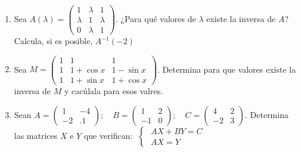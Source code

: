 \begin{enumerate}
\item Sea $A(\lambda)=\left( \begin{matrix} 1&\lambda&1\\ \lambda&1&\lambda \\0&\lambda&1 \end{matrix} \right)$. ¿Para qué valores de $\lambda$ existe la inversa de $A$? Calcula, si es posible, $A^{-1}(-2)$

\rightline{\textcolor{gris}{Solución: $\lambda \neq \pm 1$; sí es posible .}}

\item Sea $M=\left( \begin{matrix} 1&1&1\\ 1&1+\cos x& 1-\sin x \\ 1& 1+\sin x & 1+\cos x \end{matrix} \right)$. Determina para que valores existe la inversa de $M$ y cacúlala para esos valres.




\item Sean $A=\left( \begin{matrix} 1&-4\\-2&.1 \end{matrix} \right); \quad
B=\left( \begin{matrix} 1&2\\-1&0 \end{matrix} \right); \quad
C=\left( \begin{matrix} 4&2\\-2&3 \end{matrix} \right)$. Determina las matrices $X$ e $Y$ que verifican:
$\; \begin{cases}\; AX+BY=C \\ \; AX=Y   \end{cases}$



\end{enumerate}
